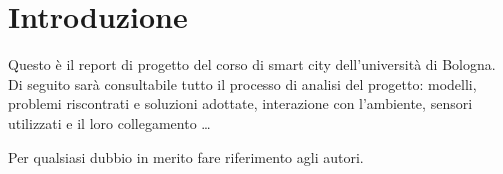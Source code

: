 \section{Introduzione}

Questo \`e il report di progetto del corso di smart city dell'universit\`a di Bologna. Di seguito sar\`a consultabile tutto il processo di analisi del progetto: modelli, problemi riscontrati e soluzioni adottate, interazione con l'ambiente, sensori utilizzati e il loro collegamento \ldots

Per qualsiasi dubbio in merito fare riferimento agli autori.
